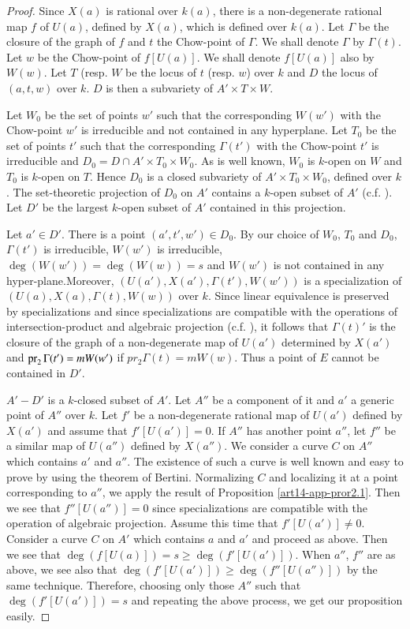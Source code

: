 \begin{proof}
Since $X(a)$ is rational over $k(a)$, there is a non-degenerate rational map $f$ of $U(a)$, defined by $X(a)$, which is defined over $k(a)$. Let $\Gamma$ be the closure of the graph of $f$ and $t$ the Chow-point of $\Gamma$. We shall denote $\Gamma$ by $\Gamma(t)$. Let $w$ be the Chow-point of $f[U(a)]$. We shall denote $f[U(a)]$ also by $W(w)$. Let $T$ (resp. $W$ be the locus of $t$ (resp. $w$) over $k$ and $D$ the locus of $(a,t,w)$ over $k$. $D$ is then a subvariety of $A'\times T\times W$.

Let $W_{0}$ be the set of points $w'$ such that the corresponding $W(w')$ with the Chow-point $w'$ is irreducible and not contained in any hyperplane. Let $T_{0}$ be the set of points $t'$ such that the corresponding $\Gamma(t')$ with the Chow-point $t'$ is irreducible and $D_{0}=D\cap A'\times T_{0}\times W_{0}$. As is well known, $W_{0}$ is $k$-open on $W$ and $T_{0}$ is $k$-open on $T$. Hence $D_{0}$ is a closed subvariety of $A'\times T_{0}\times W_{0}$, defined over $k$. The set-theoretic projection of $D_{0}$ on $A'$ contains a $k$-open subset of $A'$ (c.f. \cite{art14-key28}). Let $D'$ be the largest $k$-open subset of $A'$ contained in this projection.

Let $a'\in D'$. There is a point $(a',t',w')\in D_{0}$. By our choice of $W_{0}$, $T_{0}$ and $D_{0}$, $\Gamma(t')$ is irreducible, $W(w')$ is irreducible, $\deg(W(w'))=\deg(W(w))=s$ and $W(w')$ is not contained in any hyper-plane.\pageoriginale Moreover, $(U(a'), X(a'),\Gamma(t'),W(w'))$ is a specialization of $(U(a), X(a),\Gamma(t),W(w))$ over $k$. Since linear equivalence is preserved by specializations and since specializations are compatible with the operations of intersection-product and algebraic projection (c.f. \cite{art14-key24}), it follows that $\Gamma(t)'$ is the closure of the graph of a non-degenerate map of $U(a')$ determined by $X(a')$ and $\operatorname{\mathrm{pr}}_{2}\Gamma(t')=mW(w')$ if $pr_{2}\Gamma(t)=mW(w)$. Thus a point of $E$ cannot be contained in $D'$.

$A'-D'$ is a $k$-closed subset of $A'$. Let $A''$ be a component of it and $a'$ a generic point of $A''$ over $k$. Let $f'$ be a non-degenerate rational map of $U(a')$ defined by $X(a')$ and assume that $f'[U(a')]=0$. If $A''$ has another point $a''$, let $f''$ be a similar map of $U(a'')$ defined by $X(a'')$. We consider a curve $C$ on $A''$ which contains $a'$ and $a''$. The existence of such a curve is well known and easy to prove by using the theorem of Bertini. Normalizing $C$ and localizing it at a point corresponding to $a''$, we apply the result of Proposition \ref{art14-app-pror2.1}. Then we see that $f''[U(a'')]=0$ since specializations are compatible with the operation of algebraic projection. Assume this time that $f'[U(a')]\neq 0$. Consider a curve $C$ on $A'$ which contains $a$ and $a'$ and proceed as above. Then we see that $\deg(f[U(a)])=s\geq \deg(f'[U(a')])$. When $a''$, $f''$ are as above, we see also that $\deg(f'[U(a')])\geq \deg (f''[U(a'')])$ by the same technique. Therefore, choosing only those $A''$ such that $\deg(f'[U(a')])=s$ and repeating the above process, we get our proposition easily.
\end{proof}

